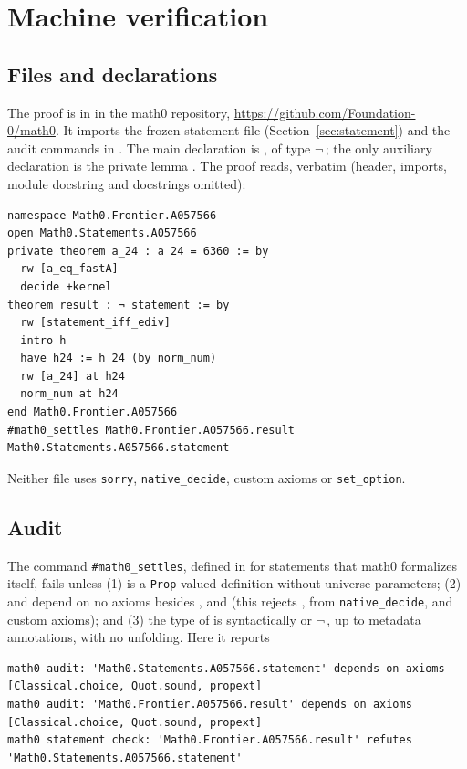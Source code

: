 \documentclass[11pt]{amsart}
\theoremstyle{plain}
\theoremstyle{definition}
\begin{document}
\section{Machine verification}\label{sec:lean}

\subsection*{Files and declarations}
The proof is in  in the math0 repository, \url{https://github.com/Foundation-0/math0}. It imports the frozen statement file  (Section~\ref{sec:statement}) and the audit commands in . The main declaration is , of type $\neg$\,; the only auxiliary declaration is the private lemma . The proof reads, verbatim (header, imports, module docstring and docstrings omitted):
\begin{lstlisting}
namespace Math0.Frontier.A057566
open Math0.Statements.A057566
private theorem a_24 : a 24 = 6360 := by
  rw [a_eq_fastA]
  decide +kernel
theorem result : ¬ statement := by
  rw [statement_iff_ediv]
  intro h
  have h24 := h 24 (by norm_num)
  rw [a_24] at h24
  norm_num at h24
end Math0.Frontier.A057566
#math0_settles Math0.Frontier.A057566.result Math0.Statements.A057566.statement
\end{lstlisting}
Neither file uses \texttt{sorry}, \texttt{native\_decide}, custom axioms or \texttt{set\_option}.

\subsection*{Audit}
The command \texttt{\#math0\_settles}, defined in  for statements that math0 formalizes itself, fails unless (1)  is a \texttt{Prop}-valued definition without universe parameters; (2)  and  depend on no axioms besides ,  and  (this rejects ,  from \texttt{native\_decide}, and custom axioms); and (3) the type of  is syntactically  or $\neg$\,, up to metadata annotations, with no unfolding. Here it reports
\begin{lstlisting}[basicstyle=\ttfamily\scriptsize]
math0 audit: 'Math0.Statements.A057566.statement' depends on axioms [Classical.choice, Quot.sound, propext]
math0 audit: 'Math0.Frontier.A057566.result' depends on axioms [Classical.choice, Quot.sound, propext]
math0 statement check: 'Math0.Frontier.A057566.result' refutes 'Math0.Statements.A057566.statement'
\end{lstlisting}
\end{document}
